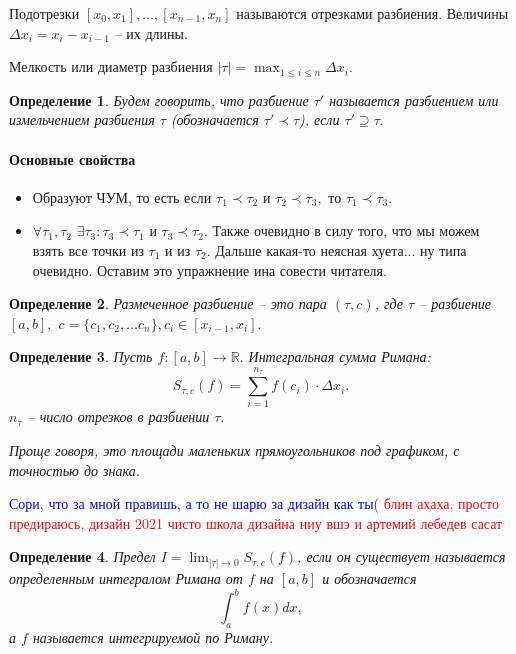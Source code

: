 \documentclass{article}
\theoremstyle{plain}
\newtheorem{definition}{Определение}
\theoremstyle{definition}
\theoremstyle{remark}
\begin{document}
Подотрезки $[x_0, x_1],\ldots, [x_{n-1}, x_n]$ называются отрезками разбиения. Величины $\Delta x_i = x_i - x_{i-1}$ -- их длины.

Мелкость или диаметр разбиения $ |\tau| = \max_{1\leq i \leq n}\Delta x_{i}.$

\begin{definition}
Будем говорить, что разбиение $\tau'$ называется разбиением или измельчением разбиения $\tau$ (обозначается $\tau' \prec \tau$), если $\tau' \supseteq \tau.$
\end{definition}

\paragraph{Основные свойства}
\begin{itemize}
    \item Образуют ЧУМ, то есть если $\tau_1 \prec \tau_2$ и $\tau_2 \prec \tau_3,$ то $\tau_1 \prec \tau_3$.
    \item $\forall \tau_1, \tau_2$ $\exists \tau_3: \tau_3 \prec \tau_1$ и $\tau_3 \prec \tau_2$. Также очевидно в силу того, что мы можем взять все точки из $\tau_1$ и из $\tau_2$. Дальше какая-то неясная хуета... ну типа очевидно. Оставим это упражнение ина совести читателя.
\end{itemize}

\begin{definition}
Размеченное разбиение -- это пара $(\tau, c)$, где $\tau$ -- разбиение $[a, b],$ $c = \{c_1, c_2, ... c_n\}, c_i \in [x_{i-1}, x_i].$
\end{definition}



\begin{definition}
Пусть $f : [a, b] \rightarrow \mathbb{R}.$ Интегральная сумма Римана: \[S_{\tau, c}(f) = \sum_{i = 1}^{n_{\tau}} f(c_i) \cdot \Delta x_i.\]
$n_{\tau}$ -- число отрезков в разбиении $\tau.$

Проще говоря, это площади маленьких прямоугольников под графиком, с точностью до знака.
\end{definition}
\textcolor{blue}{Сори, что за мной правишь, а то не шарю за дизайн как ты(}
\textcolor{red}{блин ахаха, просто предираюсь, дизайн 2021 чисто школа дизайна ниу вшэ и артемий лебедев сасат}
\begin{definition}
Предел $I = \lim_{|\tau| \rightarrow 0}S_{\tau, c}(f)$, если он существует называется определенным интегралом Римана от $f$ на $[a, b]$ и обозначается
$$\int_a^bf(x)dx,$$
а $f$ называется интегрируемой по Риману.
\end{definition}
\end{document}
